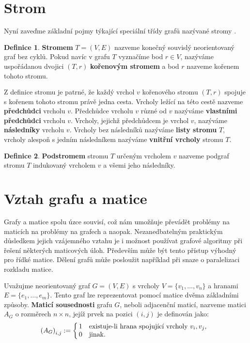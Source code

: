 \documentclass[11pt,american,czech,oneside]{book}
\theoremstyle{plain}
\theoremstyle{definition}
\newtheorem{definition}{Definice}
\begin{document}
\section{Strom}

Nyní zaveďme základní pojmy týkající speciální třídy grafů nazývané stromy \cite{koub:11}.

\begin{definition}
  \textbf{Stromem} $T=(V,E)$ nazveme konečný souvislý neorientovaný graf bez cyklů. Pokud navíc v grafu $T$ vyznačíme bod $r \in V$, nazýváme uspořádanou dvojici $(T,r)$ \textbf{kořenovým stromem} a bod $r$ nazveme kořenem tohoto stromu.
\end{definition}

Z definice stromu je patrné, že každý vrchol $v$ kořenového stromu $(T,r)$ spojuje s kořenem tohoto stromu právě jedna cesta.
Vrcholy ležící na této cestě nazveme \textbf{předchůdci} vrcholu $v$. Předchůdce vrcholu $v$ různé od $v$ nazýváme \textbf{vlastními předchůdci} vrcholu $v$. Vrcholy, jejichž předchůdcem je vrchol $v$, nazýváme \textbf{následníky} vrcholu $v$. Vrcholy bez následníků nazýváme \textbf{listy stromu} $T$, vrcholy alespoň s jedním následníkem nazýváme \textbf{vnitřní vrcholy} stromu $T$.

\begin{definition}
  \textbf{Podstromem} stromu $T$ určeným vrcholem $v$ nazveme podgraf stromu $T$ indukovaný vrcholem $v$ a všemi jeho následníky.
\end{definition}

\section{Vztah grafu a matice}
\label{GrMatRel}
Grafy a matice spolu úzce souvisí, což nám umožňuje převádět problémy na maticích na problémy na grafech a naopak. Nezanedbatelným praktickým důsledkem jejich vzájemného vztahu je i možnost používat grafové algoritmy při řešení některých maticových úloh. Především může být tento přístup výhodný pro řídké matice. Dělení grafů může posloužit například při snaze o paralelizaci rozkladu matice.

Uvažujme neorientovaný graf $G=(V,E)$ s vrcholy $V = \{v_1, \ldots, v_n\}$ a hranami $E = \{e_1, \ldots, e_m\}$. Tento graf lze reprezentovat pomocí matice dvěma základními způsoby. \textbf{Maticí sousednosti} grafu $G$, neboli adjacenční maticí, nazveme matici $A_G$ o rozměrech $n \times n$, jejíž prvek na pozici $(i,j)$ je definován jako:
\[
  {(A_G)}_{i,j} :=
  \left\{
    \begin{array}{@{\,}ll}
      1  & \mbox{existuje-li hrana spojující vrcholy $v_i, v_j$,} \\
      0  & \mbox{jinak.}
    \end{array}
  \right.
\]
\end{document}
